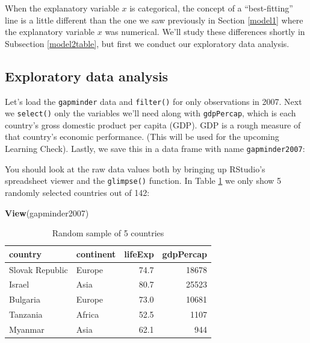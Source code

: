 \documentclass[12pt,]{krantz}
\makeatletter
\newenvironment{Shaded}{\begin{snugshade}}{\end{snugshade}}
\newcommand{\KeywordTok}[1]{\textcolor[rgb]{0.27,0.27,0.27}{\textbf{#1}}}
\newcommand{\DecValTok}[1]{\textcolor[rgb]{0.06,0.06,0.06}{#1}}
\newcommand{\StringTok}[1]{\textcolor[rgb]{0.5,0.5,0.5}{#1}}
\newcommand{\OperatorTok}[1]{\textcolor[rgb]{0.43,0.43,0.43}{\textbf{#1}}}
\newcommand{\NormalTok}[1]{#1}
\newenvironment{kframe}{%
\medskip{}
\setlength{\fboxsep}{.8em}
 \def\at@end@of@kframe{}%
 \ifinner\ifhmode%
  \def\at@end@of@kframe{\end{minipage}}%
  \begin{minipage}{\columnwidth}%
 \fi\fi%
 \def\FrameCommand##1{\hskip\@totalleftmargin \hskip-\fboxsep
 \colorbox{shadecolor}{##1}\hskip-\fboxsep
     \hskip-\linewidth \hskip-\@totalleftmargin \hskip\columnwidth}%
 \MakeFramed {\advance\hsize-\width
   \@totalleftmargin\z@ \linewidth\hsize
   \@setminipage}}%
 {\par\unskip\endMakeFramed%
 \at@end@of@kframe}
\renewenvironment{Shaded}{\begin{kframe}}{\end{kframe}}
\theoremstyle{definition}
\theoremstyle{definition}
\theoremstyle{definition}
\theoremstyle{remark}
\makeatother
\begin{document}
When the explanatory variable \(x\) is categorical, the concept of a
``best-fitting'' line is a little different than the one we saw
previously in Section \ref{model1} where the explanatory variable \(x\)
was numerical. We'll study these differences shortly in Subsection
\ref{model2table}, but first we conduct our exploratory data analysis.

\subsection{Exploratory data analysis}\label{model2EDA}

Let's load the \texttt{gapminder} data and \texttt{filter()} for only
observations in 2007. Next we \texttt{select()} only the variables we'll
need along with \texttt{gdpPercap}, which is each country's gross
domestic product per capita (GDP). GDP is a rough measure of that
country's economic performance. (This will be used for the upcoming
Learning Check). Lastly, we save this in a data frame with name
\texttt{gapminder2007}:

\begin{Shaded}
\end{Shaded}

You should look at the raw data values both by bringing up RStudio's
spreadsheet viewer and the \texttt{glimpse()} function. In Table
\ref{tab:model2-data-preview} we only show 5 randomly selected countries
out of 142:

\begin{Shaded}
\begin{Highlighting}[]
\KeywordTok{View}\NormalTok{(gapminder2007)}
\end{Highlighting}
\end{Shaded}

\begin{table}[H]

\caption{\label{tab:model2-data-preview}Random sample of 5 countries}
\centering
\fontsize{10}{12}\selectfont
\begin{tabular}[t]{llrr}
\toprule
country & continent & lifeExp & gdpPercap\\
\midrule
Slovak Republic & Europe & 74.7 & 18678\\
Israel & Asia & 80.7 & 25523\\
Bulgaria & Europe & 73.0 & 10681\\
Tanzania & Africa & 52.5 & 1107\\
Myanmar & Asia & 62.1 & 944\\
\bottomrule
\end{tabular}
\end{table}
\end{document}
